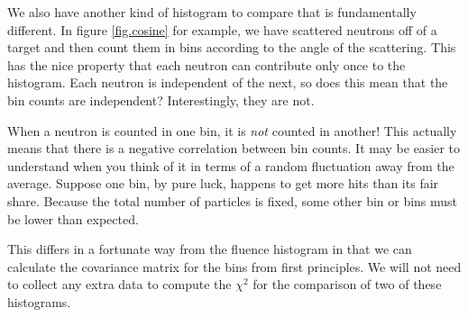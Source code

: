 \documentclass[letterpaper,12pt]{article}
\begin{document}
We also have another kind of histogram to compare that is fundamentally different. In figure \ref{fig.cosine} for example, we have scattered neutrons off of a target and then count them in bins according to the angle of the scattering. This has the nice property that each neutron can contribute only once to the histogram. Each neutron is independent of the next, so does this mean that the bin counts are independent? Interestingly, they are not.

When a neutron is counted in one bin, it is \textit{not} counted in another! This actually means that there is a negative correlation between bin counts. It may be easier to understand when you think of it in terms of a random fluctuation away from the average. Suppose one bin, by pure luck, happens to get more hits than its fair share. Because the total number of particles is fixed, some other bin or bins must be lower than expected.

This differs in a fortunate way from the fluence histogram in that we can calculate the covariance matrix for the bins from first principles. We will not need to collect any extra data to compute the $\chi^2$ for the comparison of two of these histograms.
\end{document}
